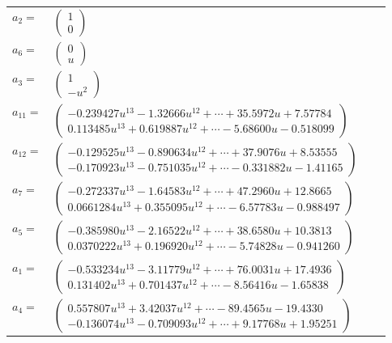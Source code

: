 \documentclass[1p]{elsarticle_modified}
\theoremstyle{definition}
\begin{document}
\begin{tabular}{m{7pt} m{180pt} m{7pt} m{180pt} }
\flushright $a_{2}=$&$\begin{pmatrix}1\\0\end{pmatrix}$ \\
\flushright $a_{6}=$&$\begin{pmatrix}0\\u\end{pmatrix}$ \\
\flushright $a_{3}=$&$\begin{pmatrix}1\\- u^2\end{pmatrix}$ \\
\flushright $a_{11}=$&$\begin{pmatrix}-0.239427 u^{13}-1.32666 u^{12}+\cdots+35.5972 u+7.57784\\0.113485 u^{13}+0.619887 u^{12}+\cdots-5.68600 u-0.518099\end{pmatrix}$ \\
\flushright $a_{12}=$&$\begin{pmatrix}-0.129525 u^{13}-0.890634 u^{12}+\cdots+37.9076 u+8.53555\\-0.170923 u^{13}-0.751035 u^{12}+\cdots-0.331882 u-1.41165\end{pmatrix}$ \\
\flushright $a_{7}=$&$\begin{pmatrix}-0.272337 u^{13}-1.64583 u^{12}+\cdots+47.2960 u+12.8665\\0.0661284 u^{13}+0.355095 u^{12}+\cdots-6.57783 u-0.988497\end{pmatrix}$ \\
\flushright $a_{5}=$&$\begin{pmatrix}-0.385980 u^{13}-2.16522 u^{12}+\cdots+38.6580 u+10.3813\\0.0370222 u^{13}+0.196920 u^{12}+\cdots-5.74828 u-0.941260\end{pmatrix}$ \\
\flushright $a_{1}=$&$\begin{pmatrix}-0.533234 u^{13}-3.11779 u^{12}+\cdots+76.0031 u+17.4936\\0.131402 u^{13}+0.701437 u^{12}+\cdots-8.56416 u-1.65838\end{pmatrix}$ \\
\flushright $a_{4}=$&$\begin{pmatrix}0.557807 u^{13}+3.42037 u^{12}+\cdots-89.4565 u-19.4330\\-0.136074 u^{13}-0.709093 u^{12}+\cdots+9.17768 u+1.95251\end{pmatrix}$ \\

\end{tabular}
\end{document}
